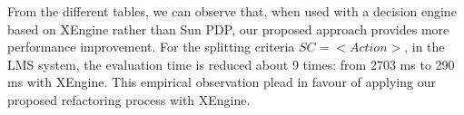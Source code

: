 From the different tables, we can observe that, when used with a decision engine based on XEngine rather than Sun PDP, our proposed approach provides more performance improvement. 
For the splitting criteria $SC=<Action>$, in the LMS system, the evaluation time is reduced about 9 times: from 2703 ms to 290 ms with XEngine. This empirical observation plead in favour of applying our proposed
 refactoring process with XEngine.

